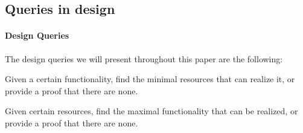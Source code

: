 

\subsection{Queries in design}

\paragraph{Design Queries} The design queries we will present throughout this paper are the following:
\begin{compactitem}
\item Given a certain functionality, find the minimal resources that can realize it, or provide a proof that there are none.
\item Given certain resources, find the maximal functionality that can be realized, or provide a proof that there are none.
\end{compactitem}



